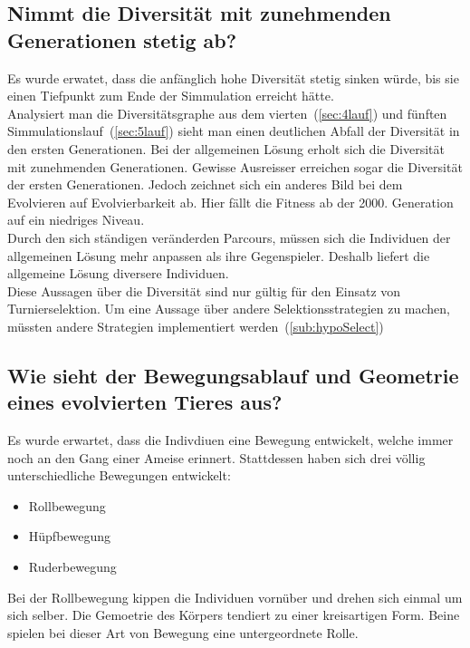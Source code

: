     \subsection{Nimmt die Diversität mit zunehmenden Generationen stetig ab?}
      Es wurde erwatet, dass die anfänglich hohe Diversität stetig sinken würde,
      bis sie einen Tiefpunkt zum Ende der Simmulation erreicht hätte.
      \\
      Analysiert man die Diversitätsgraphe aus dem vierten~(\vref{sec:4lauf}) und
      fünften Simmulationslauf~(\vref{sec:5lauf}) sieht man einen deutlichen Abfall der Diversität in den ersten Generationen.
      Bei der allgemeinen Lösung erholt sich die Diversität mit zunehmenden Generationen.
      Gewisse Ausreisser erreichen sogar die Diversität der ersten Generationen.
      Jedoch zeichnet sich ein anderes Bild bei dem Evolvieren auf Evolvierbarkeit ab.
      Hier fällt die Fitness ab der 2000. Generation auf ein niedriges Niveau.
      \\
      Durch den sich ständigen veränderden Parcours,
      müssen sich die Individuen der allgemeinen Lösung mehr anpassen als ihre Gegenspieler.
      Deshalb liefert die allgemeine Lösung diversere Individuen.
      \\
      Diese Aussagen über die Diversität sind nur gültig für den Einsatz von Turnierselektion.
      Um eine Aussage über andere Selektionsstrategien zu machen,
      müssten andere Strategien implementiert werden~(\vref{sub:hypoSelect})

    \subsection{Wie sieht der Bewegungsablauf und Geometrie eines evolvierten Tieres aus?}

      Es wurde erwartet, dass die Indivdiuen eine Bewegung entwickelt, welche immer noch an den Gang einer Ameise erinnert.
      Stattdessen haben sich drei völlig unterschiedliche Bewegungen entwickelt:

      \begin{itemize}
        \item Rollbewegung
        \item Hüpfbewegung
        \item Ruderbewegung
      \end{itemize}

      Bei der Rollbewegung kippen die Individuen vornüber und drehen sich einmal um sich selber.
      Die Gemoetrie des Körpers tendiert zu einer kreisartigen Form.
      Beine spielen bei dieser Art von Bewegung eine untergeordnete Rolle.

